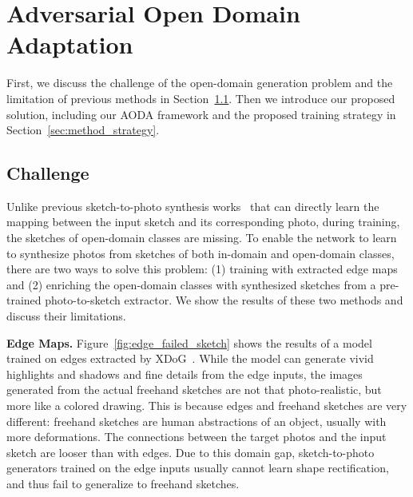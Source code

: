 \documentclass[10pt,twocolumn,letterpaper]{article}
\begin{document}
\section{Adversarial Open Domain Adaptation}
\label{sec:method}
First, we discuss the challenge of the open-domain generation problem and the limitation of previous methods in Section~\ref{subsec:challenge}. Then we introduce our proposed solution, including our AODA framework and the proposed training strategy in Section~\ref{sec:method_strategy}. \subsection{Challenge}
\label{subsec:challenge}
Unlike previous sketch-to-photo synthesis works~\cite{chen2018sketchygan,ghosh2019interactive} that can directly learn the mapping between the input sketch and its corresponding photo, during training, the sketches of open-domain classes are missing. To enable the network to learn to synthesize photos from sketches of both in-domain and open-domain classes, there are two ways to solve this problem: (1) training with extracted edge maps and (2) enriching the open-domain classes with synthesized sketches from a pre-trained photo-to-sketch extractor. We show the results of these two methods and discuss their limitations.

\noindent \textbf{Edge Maps.} Figure~\ref{fig:edge_failed_sketch} shows the results of a model trained on edges extracted by XDoG~\cite{winnemoller2012xdog}. While the model can generate vivid highlights and shadows and fine details from the edge inputs, the images generated from the actual freehand sketches are not that photo-realistic, but more like a colored drawing. This is because edges and freehand sketches are very different: freehand sketches are human abstractions of an object, usually with more deformations. The connections between the target photos and the input sketch are looser than with edges. Due to this domain gap, sketch-to-photo generators trained on the edge inputs usually cannot learn shape rectification, and thus fail to generalize to freehand sketches. 
\end{document}
